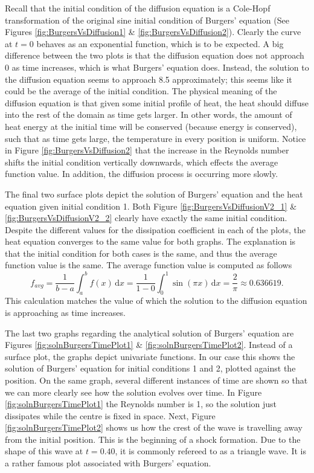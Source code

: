 \documentclass[undefended]{sfuthesis}
\begin{document}
Recall that the initial condition of the diffusion equation is a Cole-Hopf transformation of the original sine initial condition of Burgers' equation (See Figures \ref{fig:BurgersVsDiffusion1} \& \ref{fig:BurgersVsDiffusion2}). Clearly the curve at $t = 0$ behaves as an exponential function, which is to be expected. A big difference between the two plots is that the diffusion equation does not approach 0 as time increases, which is what Burgers' equation does. Instead, the solution to the diffusion equation seems to approach 8.5 approximately; this seems like it could be the average of the initial condition. The physical meaning of the diffusion equation is that given some initial profile of heat, the heat should diffuse into the rest of the domain as time gets larger. In other words, the amount of heat energy at the initial time will be conserved (because energy is conserved), such that as time gets large, the temperature in every position is uniform. Notice in Figure \ref{fig:BurgersVsDiffusion2} that the increase in the Reynolds number shifts the initial condition vertically downwards, which effects the average function value. In addition, the diffusion process is occurring more slowly.

The final two surface plots depict the solution of Burgers' equation and the heat equation given initial condition 1. Both Figure \ref{fig:BurgersVsDiffusionV2_1} \& \ref{fig:BurgersVsDiffusionV2_2} clearly have exactly the same initial condition. Despite the different values for the dissipation coefficient in each of the plots, the heat equation converges to the same value for both graphs. The explanation is that the initial condition for both cases is the same, and thus the average function value is the same. The average function value is computed as follows \[f_{avg} = \frac{1}{b - a} \int_{a}^{b} f(x) \,\mathrm{d}x = \frac{1}{1 - 0} \int_{0}^{1} \sin (\pi x) \,\mathrm{d} x = \frac{2}{\pi} \approx 0.636619.\] This calculation matches the value of which the solution to the diffusion equation is approaching as time increases.

The last two graphs regarding the analytical solution of Burgers' equation are Figures \ref{fig:solnBurgersTimePlot1} \& \ref{fig:solnBurgersTimePlot2}. Instead of a surface plot, the graphs depict univariate functions. In our case this shows the solution of Burgers' equation for initial conditions 1 and 2, plotted against the position. On the same graph, several different instances of time are shown so that we can more clearly see how the solution evolves over time. In Figure \ref{fig:solnBurgersTimePlot1} the Reynolds number is 1, so the solution just dissipates while the centre is fixed in space. Next, Figure \ref{fig:solnBurgersTimePlot2} shows us how the crest of the wave is travelling away from the initial position. This is the beginning of a shock formation. Due to the shape of this wave at $t = 0.40$, it is commonly refereed to as a triangle wave. It is a rather famous plot associated with Burgers' equation. 
\end{document}
